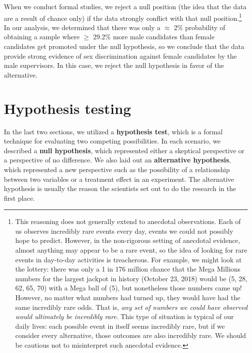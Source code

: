 \documentclass[
  10pt,
  openany]{book}
\theoremstyle{definition}
\theoremstyle{definition}
\theoremstyle{definition}
\theoremstyle{definition}
\theoremstyle{remark}
\begin{document}
When we conduct formal studies, we reject a null position (the idea that the data are a result of chance only) if the data strongly conflict with that null position.\footnote{This reasoning does not generally extend to anecdotal observations.
  Each of us observes incredibly rare events every day, events we could not possibly hope to predict.
  However, in the non-rigorous setting of anecdotal evidence, almost anything may appear to be a rare event, so the idea of looking for rare events in day-to-day activities is treacherous.
  For example, we might look at the lottery: there was only a 1 in 176 million chance that the Mega Millions numbers for the largest jackpot in history (October 23, 2018) would be (5, 28, 62, 65, 70) with a Mega ball of (5), but nonetheless those numbers came up!
  However, no matter what numbers had turned up, they would have had the same incredibly rare odds.
  That is, \emph{any set of numbers we could have observed would ultimately be incredibly rare}.
  This type of situation is typical of our daily lives: each possible event in itself seems incredibly rare, but if we consider every alternative, those outcomes are also incredibly rare.
  We should be cautious not to misinterpret such anecdotal evidence.}
In our analysis, we determined that there was only a \(\approx\) 2\% probability of obtaining a sample where \(\geq\) 29.2\% more male candidates than female candidates get promoted under the null hypothesis, so we conclude that the data provide strong evidence of sex discrimination against female candidates by the male supervisors.
In this case, we reject the null hypothesis in favor of the alternative.

\section{Hypothesis testing}\label{HypothesisTesting}

In the last two sections, we utilized a \textbf{hypothesis test}, which is a formal technique for evaluating two competing possibilities.
In each scenario, we described a \textbf{null hypothesis}, which represented either a skeptical perspective or a perspective of no difference.
We also laid out an \textbf{alternative hypothesis}, which represented a new perspective such as the possibility of a relationship between two variables or a treatment effect in an experiment.
The alternative hypothesis is usually the reason the scientists set out to do the research in the first place.
\end{document}

